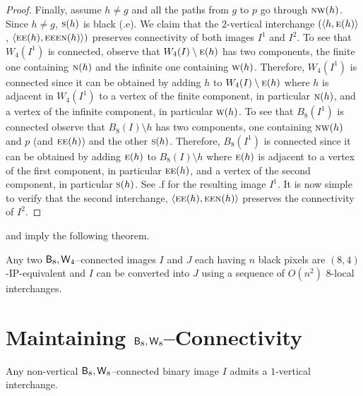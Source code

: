 \documentclass[lotsofwhite,charterfonts]{patmorin}
\newcommand{\eightfour}{\ensuremath{\protect\textup{\textsf{B}}_{8},\protect\textup{\textsf{W}}_{4}}}
\newcommand{\eighteight}{\ensuremath{\protect\textup{\textsf{B}}_{8},\protect\textup{\textsf{W}}_{8}}}
\newcommand{\N}{\textsc{n}}
\newcommand{\E}{\textsc{e}}
\renewcommand{\S}{\textsc{s}}
\newcommand{\W}{\textsc{w}}
\newcommand{\NW}{\textsc{nw}}
\newcommand{\ic}[2]{\langle #1,#2 \rangle}
\newcommand{\sm}{\ensuremath{\setminus}}
\begin{document}
\begin{proof}
Finally, assume $h\not=g$ and all the paths from $g$ to $p$ go through
$\NW(h)$. Since $h\not=g$, $\S(h)$ is black (.e).  We
claim that the $2$-vertical interchange $(\ic{h}{\E(h)}$,
$\ic{\E\E(h)}{\E\E\E\N(h)})$ preserves connectivity of both images
$I^1$ and $I^2$. To see that $W_4(I^1)$ is connected, observe that
$W_4(I)\sm \E(h)$ has two components, the finite one containing
$\N(h)$ and the infinite one containing $\W(h)$. Therefore, $W_4(I^1)$
is connected since it can be obtained by adding $h$ to $W_4(I)\sm
\E(h)$ where $h$ is adjacent in $W_4(I^1)$ to a vertex of the finite
component, in particular $\N(h)$, and a vertex of the infinite
component, in particular $\W(h)$. To see that $B_8(I^1)$ is connected
observe that $B_8(I)\sm h$ has two components, one containing $\NW(h)$
and $p$ (and $\E\E(h)$) and the other $\S(h)$. Therefore, $B_8(I^1)$
is connected since it can be obtained by adding $\E(h)$ to $B_8(I)\sm
h$ where $\E(h)$ is adjacent to a vertex of the first component, in
particular $\E\E(h)$, and a vertex of the second component, in
particular $\S(h)$. See .f for the resulting image
$I^1$. It is now simple to verify that the second interchange,
$\ic{\E\E(h)}{\E\E\N(h)}$ preserves the connectivity of $I^2$.

\end{proof}

 and  imply the following theorem.


\begin{thm}
Any two \eightfour--connected images $I$ and $J$ each having $n$ black
pixels are $(8,4)$-IP-equivalent and $I$ can be converted into $J$ using a
sequence of $O(n^2)$ 8-local interchanges.
\end{thm}



\section{Maintaining \eighteight--Connectivity}



\begin{lem} 
Any  non-vertical $\eighteight$--connected binary image $I$ admits a
$1$-vertical interchange.
\end{lem}
\end{document}
